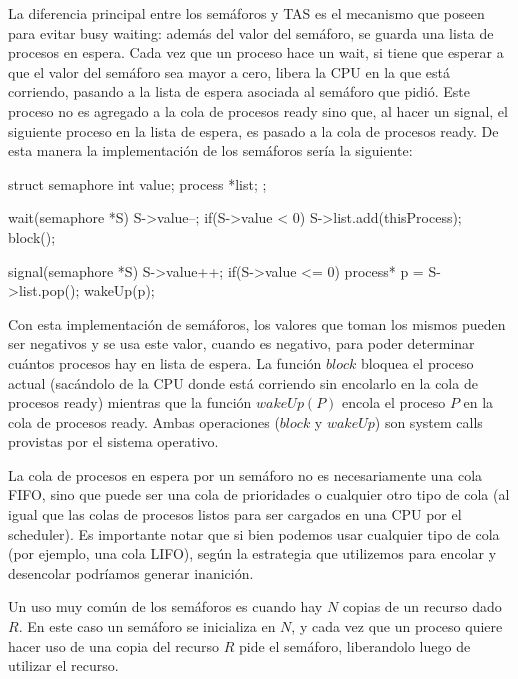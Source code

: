 \documentclass{article}
\begin{document}
La diferencia principal entre los semáforos y TAS es el mecanismo que poseen para evitar busy waiting: adem\'as del valor del sem\'aforo, se guarda una lista de procesos en espera. Cada vez que un proceso hace un wait, si tiene que esperar a que el valor del sem\'aforo sea mayor a cero, libera la CPU en la que est\'a corriendo, pasando a la lista de espera asociada al sem\'aforo que pidi\'o. Este proceso no es agregado a la cola de procesos ready sino que, al hacer un signal, el siguiente proceso en la lista de espera, es pasado a la cola de procesos ready. De esta manera la implementaci\'on de los sem\'aforos ser\'ia la siguiente:

\begin{code}
struct semaphore{
    int value;
		process *list;
};
\end{code}

\newpage
\begin{code}
wait(semaphore *S)
{
    S->value--;
		if(S->value < 0)
		{
		    S->list.add(thisProcess);
				block();
		}
}
\end{code}

\begin{code}
signal(semaphore *S)
{
    S->value++;
		if(S->value <= 0)
		{
		    process* p = S->list.pop();
		    wakeUp(p);
		}
}
\end{code}

Con esta implementaci\'on de sem\'aforos, los valores que toman los mismos pueden ser negativos y se usa este valor, cuando es negativo, para poder determinar cu\'antos procesos hay en lista de espera. La funci\'on $block$ bloquea el proceso actual (sac\'andolo de la CPU donde est\'a corriendo sin encolarlo en la cola de procesos ready) mientras que la funci\'on $wakeUp(P)$ encola el proceso $P$ en la cola de procesos ready. Ambas operaciones ($block$ y $wakeUp$) son system calls provistas por el sistema operativo.

La cola de procesos en espera por un sem\'aforo no es necesariamente una cola FIFO, sino que puede ser una cola de prioridades o cualquier otro tipo de cola (al igual que las colas de procesos listos para ser cargados en una CPU por el scheduler). Es importante notar que si bien podemos usar cualquier tipo de cola (por ejemplo, una cola LIFO), seg\'un la estrategia que utilizemos para encolar y desencolar podr\'iamos generar inanici\'on.

Un uso muy com\'un de los sem\'aforos es cuando hay $N$ copias de un recurso dado $R$. En este caso un sem\'aforo se inicializa en $N$, y cada vez que un proceso quiere hacer uso de una copia del recurso $R$ pide el sem\'aforo, liberandolo luego de utilizar el recurso.
\end{document}
